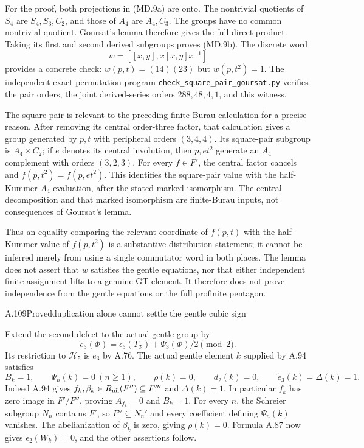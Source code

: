 For the proof, both projections in (MD.9a) are onto. The nontrivial
quotients of $S_4$ are $S_4,S_3,C_2$, and those of $A_4$ are
$A_4,C_3$. The groups have no common nontrivial quotient.
Goursat's lemma therefore gives the full direct product.
Taking its first and second derived subgroups proves (MD.9b).
The discrete word
\[
 w=[[x,y],x[x,y]x^{-1}]
\]
provides a concrete check: $w(p,t)=(14)(23)$ but
$w(p,t^2)=1$. The independent exact permutation program
\texttt{check\_square\_pair\_goursat.py} verifies the pair orders,
the joint derived-series orders $288,48,4,1$, and this witness.

The square pair is relevant to the preceding finite Burau
calculation for a precise reason. After removing its central
order-three factor, that calculation gives a group generated by
$p,t$ with peripheral orders $(3,4,4)$. Its square-pair subgroup
is $A_4\times C_2$; if $e$ denotes its central involution, then
$p,et^2$ generate an $A_4$ complement with orders $(3,2,3)$.
For every $f\in F'$, the central factor cancels and
$f(p,t^2)=f(p,et^2)$. This identifies the square-pair value with
the half-Kummer $A_4$ evaluation, after the stated marked
isomorphism. The central decomposition and that marked
isomorphism are finite-Burau inputs, not consequences of
Goursat's lemma.

Thus an equality comparing the relevant coordinate of $f(p,t)$
with the half-Kummer value of $f(p,t^2)$ is a substantive
distribution statement; it cannot be inferred merely from
using a single commutator word in both places. The lemma does
not assert that $w$ satisfies the gentle equations, nor that
either independent finite assignment lifts to a genuine GT
element. It therefore does not prove independence from the
gentle equations or the full profinite pentagon.

\begin{statement}{A.109}{Proved}{duplication alone cannot settle the gentle cubic sign}
\end{statement}
Extend the second defect to the actual gentle group by
\[
 \widetilde e_3(\Phi)=\epsilon_3(T_\Phi)+\Psi_3(\Phi)/2\pmod2.
\]
Its restriction to $\mathcal H_5$ is $e_3$ by A.76.
The actual gentle element $k$ supplied by A.94 satisfies
\[
 B_k=1,\qquad \Psi_n(k)=0\ (n\geq1),\qquad
 \rho(k)=0,\qquad d_2(k)=0,\qquad
 \widetilde e_3(k)=\Delta(k)=1.
 \tag{A.109}
\]
Indeed A.94 gives $f_k,\beta_k\in R_{\rm nil}(F'')\subseteq F'''$
and $\Delta(k)=1$. In particular $f_k$ has zero image in
$F'/F''$, proving $A_{f_k}=0$ and $B_k=1$.
For every $n$, the Schreier subgroup $N_n$ contains $F'$, so
$F''\subseteq N_n'$ and every coefficient defining $\Psi_n(k)$
vanishes. The abelianization of $\beta_k$ is zero, giving
$\rho(k)=0$. Formula A.87 now gives $\epsilon_2(W_k)=0$,
and the other assertions follow.

